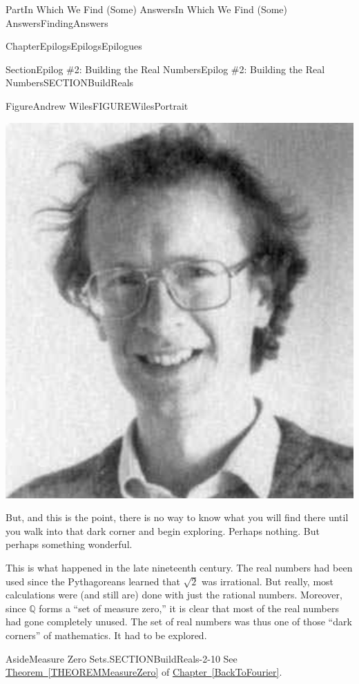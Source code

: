\documentclass[oneside,10pt,]{book}
\newcommand{\xreffont}{\relax}
\numberwithin{equation}{part}
\newcommand{\QQ}{\mathbb {Q}}
\begin{document}
\begin{partptx}{Part}{In Which We Find (Some) Answers}{}{In Which We Find (Some) Answers}{}{}{FindingAnswers}
\begin{chapterptx}{Chapter}{Epilogs}{}{Epilogs}{}{}{Epilogues}
\begin{sectionptx}{Section}{Epilog \#2: Building the Real Numbers}{}{Epilog \#2: Building the Real Numbers}{}{}{SECTIONBuildReals}
\begin{introduction}{}
\begin{figureptx}{Figure}{Andrew Wiles}{FIGUREWilesPortrait}{}%
%
%
\begin{image}{0.325}{0.35}{0.325}{}%
\includegraphics[width=\linewidth]{external/images/Wiles.png}
\end{image}%
\tcblower
\end{figureptx}%
But, and this is the point, there is no way to know what you will find there until you walk into that dark corner and begin exploring.  Perhaps nothing.  But perhaps something wonderful.%
\par
{} This is what happened in the late nineteenth century.  The real numbers had been used since the Pythagoreans learned that \(\sqrt{2}\) was irrational.  But really, most calculations were (and still are) done with just the rational numbers. Moreover, since \(\QQ\) forms a ``set of measure zero,'' it is clear that most of the real numbers had gone completely unused. The set of real numbers was thus one of those ``dark corners'' of mathematics. It had to be explored.%
\begin{aside}{Aside}{Measure Zero Sets.}{SECTIONBuildReals-2-10}%
See \hyperref[THEOREMMeasureZero]{Theorem~{\xreffont\ref{THEOREMMeasureZero}}} of \hyperref[BackToFourier]{Chapter~{\xreffont\ref{BackToFourier}}}.%

\end{aside}
\end{introduction}
\end{sectionptx}
\end{chapterptx}
\end{partptx}
\end{document}
